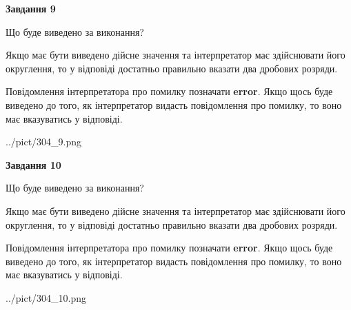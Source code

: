 \documentclass[12pt, ukrainian]{article}
\begin{document}
{\begin {Large}
{\begin {center}\textbf{Завдання 9}\end {center}}\par
Що буде виведено за виконання? \par

Якщо має бути виведено дійсне значення та інтерпретатор має здійснювати його округлення, 
то у відповіді достатньо правильно вказати два дробових розряди.

Повідомлення інтерпретатора про помилку позначати \textbf{error}.
Якщо щось буде виведено до того, як інтерпретатор видасть повідомлення про помилку, 
то воно має вказуватись у відповіді. \par

\begin{center}
	{../pict/304_9.png}
\end{center}
\newpage

{\begin {center}\textbf{Завдання 10}\end {center}}\par
Що буде виведено за виконання? \par

Якщо має бути виведено дійсне значення та інтерпретатор має здійснювати його округлення, 
то у відповіді достатньо правильно вказати два дробових розряди.

Повідомлення інтерпретатора про помилку позначати \textbf{error}.
Якщо щось буде виведено до того, як інтерпретатор видасть повідомлення про помилку, 
то воно має вказуватись у відповіді. \par

\begin{center}
	{../pict/304_10.png}
\end{center}
\newpage

\end {Large}}
\end{document}

